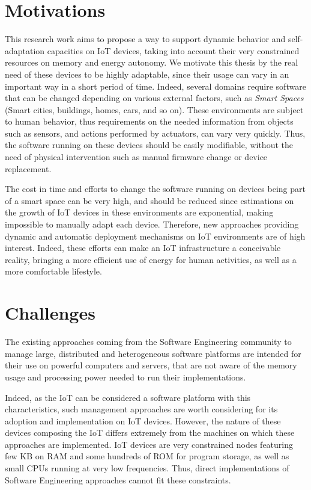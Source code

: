 \section{Motivations}
This research work aims to propose a way to support dynamic behavior and self-adaptation capacities on IoT devices, taking into account their very constrained resources on memory and energy autonomy.
We motivate this thesis by the real need of these devices to be highly adaptable, since their usage can vary in an important way in a short period of time.
Indeed, several domains require software that can be changed depending on various external factors, such as \textit{Smart Spaces} (Smart cities, buildings, homes, cars, and so on).
These environments are subject to human behavior, thus requirements on the needed information from objects such as sensors, and actions performed by actuators, can vary very quickly.
Thus, the software running on these devices should be easily modifiable, without the need of physical intervention such as manual firmware change or device replacement.

The cost in time and efforts to change the software running on devices being part of a smart space can be very high, and should be reduced since estimations on the growth of IoT devices in these environments are exponential, making impossible to manually adapt each device.
Therefore, new approaches providing dynamic and automatic deployment mechanisms on IoT environments are of high interest.
Indeed, these efforts can make an IoT infrastructure a conceivable reality, bringing a more efficient use of energy for human activities, as well as a more comfortable lifestyle.

\section{Challenges}
The existing approaches coming from the Software Engineering community to manage large, distributed and heterogeneous software platforms are intended for their use on powerful computers and servers, that are not aware of the memory usage and processing power needed to run their implementations.

Indeed, as the IoT can be considered a software platform with this characteristics, such management approaches are worth considering for its adoption and implementation on IoT devices.
However, the nature of these devices composing the IoT differs extremely from the machines on which these approaches are implemented.
IoT devices are very constrained nodes featuring few KB on RAM and some hundreds of ROM for program storage, as well as small CPUs running at very low frequencies.
Thus, direct implementations of Software Engineering approaches cannot fit these constraints.

